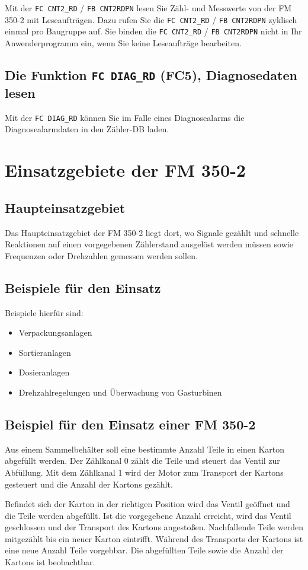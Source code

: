 Mit der \texttt{FC CNT2\_RD} / \texttt{FB CNT2RDPN} lesen Sie Zähl- und Messwerte von der FM 350-2 
mit Leseaufträgen. Dazu rufen Sie die \texttt{FC CNT2\_RD} / \texttt{FB CNT2RDPN} zyklisch einmal pro 
Baugruppe auf.  
Sie binden die \texttt{FC CNT2\_RD} / \texttt{FB CNT2RDPN} nicht in Ihr Anwenderprogramm ein, wenn 
Sie keine Leseaufträge bearbeiten.

\subsection{Die Funktion \texttt{FC DIAG\_RD} (FC5), Diagnosedaten lesen}

Mit der \texttt{FC DIAG\_RD} können Sie im Falle eines Diagnosealarms die Diagnosealarmdaten in 
den Zähler-DB laden.


\section{Einsatzgebiete der FM 350-2}

\subsection{Haupteinsatzgebiet} Das Haupteinsatzgebiet der FM 350-2 liegt dort, wo Signale gezählt und schnelle Reaktionen auf einen vorgegebenen Zählerstand ausgelöst werden müssen sowie Frequenzen oder Drehzahlen gemessen werden sollen.

\subsection{Beispiele für den Einsatz} Beispiele hierfür sind: \begin{itemize} \item Verpackungsanlagen \item Sortieranlagen \item Dosieranlagen \item Drehzahlregelungen und Überwachung von Gasturbinen \end{itemize}

\subsection{Beispiel für den Einsatz einer FM 350-2} Aus einem Sammelbehälter soll eine bestimmte Anzahl Teile in einen Karton abgefüllt werden. Der Zählkanal 0 zählt die Teile und steuert das Ventil zur Abfüllung. Mit dem Zählkanal 1 wird der Motor zum Transport der Kartons gesteuert und die Anzahl der Kartons gezählt.

Befindet sich der Karton in der richtigen Position wird das Ventil geöffnet und die Teile werden abgefüllt. Ist die vorgegebene Anzahl erreicht, wird das Ventil geschlossen und der Transport des Kartons angestoßen. Nachfallende Teile werden mitgezählt bis ein neuer Karton eintrifft.
Während des Transports der Kartons ist eine neue Anzahl Teile vorgebbar. Die abgefüllten Teile sowie die Anzahl der Kartons ist beobachtbar. 
\fi